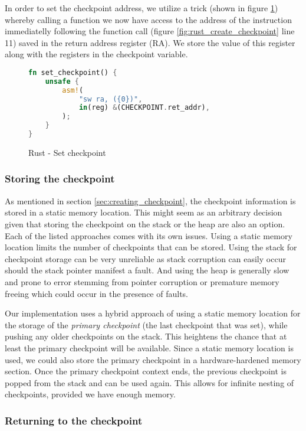 In order to set the checkpoint address, we utilize a trick (shown in figure \ref{fig:rust_set_checkpoint}) whereby calling a function we now have access to the address of the instruction immediatelly following the function call (figure \ref{fig:rust_create_checkpoint} line 11) saved in the return address register (RA). We store the value of this register along with the registers in the checkpoint variable.

\begin{figure}[!h]
\begin{lstlisting}[language=Rust]
fn set_checkpoint() {
    unsafe {
        asm!(
            "sw ra, ({0})",
            in(reg) &(CHECKPOINT.ret_addr),
        );
    }
}
\end{lstlisting}
\caption{Rust - Set checkpoint}
\label{fig:rust_set_checkpoint}
\end{figure}

\subsubsection{Storing the checkpoint}

As mentioned in section \ref{sec:creating_checkpoint}, the checkpoint information is stored in a static memory location. This might seem as an arbitrary decision given that storing the checkpoint on the stack or the heap are also an option. Each of the listed approaches comes with its own issues. Using a static memory location limits the number of checkpoints that can be stored. Using the stack for checkpoint storage can be very unreliable as stack corruption can easily occur should the stack pointer manifest a fault. And using the heap is generally slow and prone to error stemming from pointer corruption or premature memory freeing which could occur in the presence of faults.

Our implementation uses a hybrid approach of using a static memory location for the storage of the \textit{primary checkpoint} (the last checkpoint that was set), while pushing any older checkpoints on the stack. This heightens the chance that at least the primary checkpoint will be available. Since a static memory location is used, we could also store the primary checkpoint in a hardware-hardened memory section. Once the primary checkpoint context ends, the previous checkpoint is popped from the stack and can be used again. This allows for infinite nesting of checkpoints, provided we have enough memory.

\subsubsection{Returning to the checkpoint}

